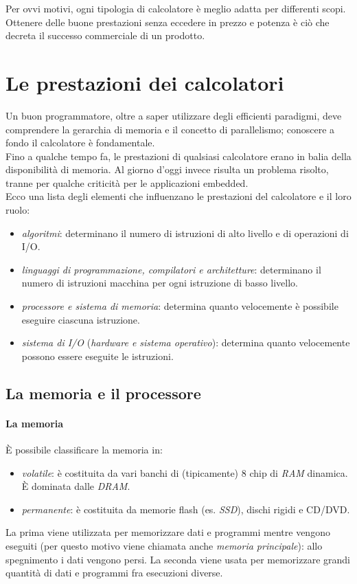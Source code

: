 \documentclass[class=book, crop=false]{standalone}
\begin{document}
Per ovvi motivi, ogni tipologia di calcolatore è meglio adatta per differenti scopi. Ottenere delle buone prestazioni senza eccedere in prezzo e potenza è ciò che decreta il successo commerciale di un prodotto.

\section{Le prestazioni dei calcolatori}
Un buon programmatore, oltre a saper utilizzare degli efficienti paradigmi, deve comprendere la gerarchia di memoria e il concetto di parallelismo; conoscere a fondo il calcolatore è fondamentale.\\
Fino a qualche tempo fa, le prestazioni di qualsiasi calcolatore erano in balia della disponibilità di memoria. Al giorno d'oggi invece risulta un problema risolto, tranne per qualche criticità per le applicazioni embedded.\\
Ecco una lista degli elementi che influenzano le prestazioni del calcolatore e il loro ruolo:
\begin{itemize}[noitemsep]
  \item \emph{algoritmi}: determinano il numero di istruzioni di alto livello e di operazioni di I/O.
  \item \emph{linguaggi di programmazione, compilatori e architetture}: determinano il numero di istruzioni macchina per ogni istruzione di basso livello.
  \item \emph{processore e sistema di memoria}: determina quanto velocemente è possibile eseguire ciascuna istruzione.
  \item \emph{sistema di I/O} (\emph{hardware e sistema operativo}): determina quanto velocemente possono essere eseguite le istruzioni.
\end{itemize}

\subsection{La memoria e il processore}
\paragraph*{La memoria}
\`{E} possibile classificare la memoria in:
\begin{itemize}[noitemsep]
	\item \emph{volatile}: è costituita da vari banchi di (tipicamente) 8 chip di \emph{RAM} dinamica. \`{E} dominata dalle \emph{DRAM}.
	\item \emph{permanente}: è costituita da memorie flash (es. \emph{SSD}), dischi rigidi e CD/DVD.
\end{itemize}
La prima viene utilizzata per memorizzare dati e programmi mentre vengono eseguiti (per questo motivo viene chiamata anche \emph{memoria principale}): allo spegnimento i dati vengono persi. La seconda viene usata per memorizzare grandi quantità di dati e programmi fra esecuzioni diverse.
\end{document}
